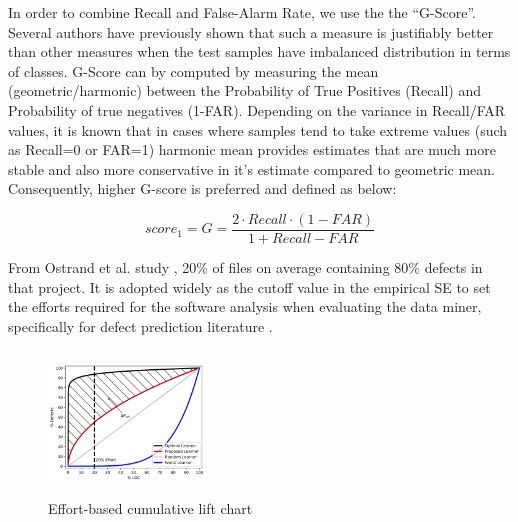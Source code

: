 \documentclass[10pt,conference]{IEEEtran}
\begin{document}
In order to combine Recall and False-Alarm Rate, we use the the ``G-Score''. Several authors \cite{shatnawi10g1, comments07} have previously shown
that such a measure is justifiably better than other measures
when the test samples have imbalanced distribution in terms
of classes.  G-Score can by computed by measuring the mean
(geometric/harmonic) between the Probability of True Positives
(Recall) and Probability of true negatives (1-FAR). Depending on the variance in Recall/FAR values, it is known that in cases where samples tend to take extreme values (such as Recall=0 or FAR=1)
harmonic mean provides estimates that are much more stable and
also more conservative in it's estimate compared to geometric
mean. Consequently, higher G-score is preferred and defined as below:

\begin{equation}
 \mathit{score_1}=\mathit{G} = \frac{2 \cdot \mathit{Recall} \cdot \mathit{(1 - FAR)} }{1 + \mathit{Recall} - \mathit{FAR}}
 \end{equation}

From Ostrand et al. study \cite{ostrand05_predicting}, 20\% of files on average containing 80\% defects in that project. It is adopted widely as the cutoff value in the empirical SE to set the efforts required for the software analysis when evaluating the data miner, specifically for defect prediction literature \cite{menzies07dp, kamei12_jit, yang16effort, monden13cost, mende10effort}. 

\begin{figure}
\vspace{-12pt}
\hspace{-25pt}
\includegraphics[width=1.65in, height=1.5in]{popt.png}
\vspace{-13pt}
\caption{Effort-based cumulative lift chart}\label{fig:popt}
\vspace{-20pt}
\end{figure} 
\end{document}
